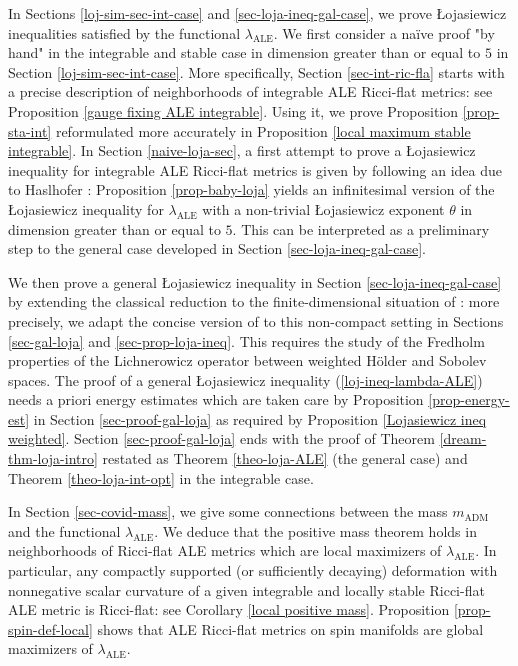 \documentclass[a4paper,11pt,reqno]{amsart}
\numberwithin{equation}{section}
\begin{document}
	
	In Sections \ref{loj-sim-sec-int-case} and \ref{sec-loja-ineq-gal-case}, we prove \L{}ojasiewicz inequalities satisfied by the functional $\lambda_{\operatorname{ALE}}$. We first consider a na\"ive proof "by hand" in the integrable and stable case in dimension greater than or equal to $5$ in Section \ref{loj-sim-sec-int-case}. More specifically, Section \ref{sec-int-ric-fla} starts with a precise description of neighborhoods of integrable ALE Ricci-flat metrics: see Proposition \ref{gauge fixing ALE integrable}. Using it, we prove Proposition \ref{prop-sta-int} reformulated more accurately in Proposition \ref{local maximum stable integrable}. In Section \ref{naive-loja-sec}, a first attempt to prove a \L ojasiewicz inequality for integrable ALE Ricci-flat metrics is given by following an idea due to Haslhofer \cite{Has-Sta}: Proposition \ref{prop-baby-loja} yields an infinitesimal version of the \L ojasiewicz inequality for $\lambda_{\operatorname{ALE}}$ with a non-trivial \L ojasiewicz exponent $\theta$ in dimension greater than or equal to $5$. This can be interpreted as a preliminary step to the general case developed in Section \ref{sec-loja-ineq-gal-case}. 
	
	We then prove a general \L{}ojasiewicz inequality in Section \ref{sec-loja-ineq-gal-case} by extending the classical reduction to the finite-dimensional situation of \cite{sim}: more precisely, we adapt the concise version of \cite{Col-Min-Ein-Tan-Con} to this non-compact setting in Sections \ref{sec-gal-loja} and \ref{sec-prop-loja-ineq}. This requires the study of the Fredholm properties of the Lichnerowicz operator between weighted H\"older and Sobolev spaces. The proof of a general \L ojasiewicz inequality (\ref{loj-ineq-lambda-ALE}) needs a priori energy estimates which are taken care by Proposition \ref{prop-energy-est} in Section \ref{sec-proof-gal-loja} as required by Proposition \ref{Lojasiewicz ineq weighted}. Section \ref{sec-proof-gal-loja} ends with the proof of Theorem \ref{dream-thm-loja-intro} restated as Theorem \ref{theo-loja-ALE} (the general case) and Theorem \ref{theo-loja-int-opt} in the integrable case.
	
	In Section \ref{sec-covid-mass}, we give some connections between the mass $m_{\operatorname{ADM}}$ and the functional $\lambda_{\operatorname{ALE}}$. We deduce that the positive mass theorem holds in neighborhoods of Ricci-flat ALE metrics which are local maximizers of $\lambda_{\operatorname{ALE}}$. In particular, any compactly supported (or sufficiently decaying) deformation with nonnegative scalar curvature of a given integrable and locally stable Ricci-flat ALE metric is Ricci-flat: see Corollary \ref{local positive mass}. Proposition \ref{prop-spin-def-local} shows that ALE Ricci-flat metrics on spin manifolds are global maximizers of $\lambda_{\operatorname{ALE}}$.
	
\end{document}
